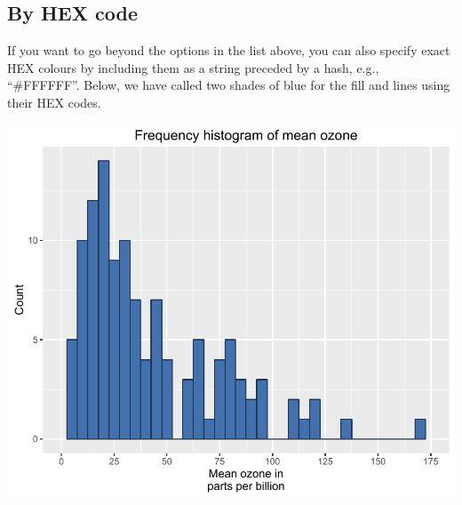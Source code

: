 \subsection{By HEX code}\label{by-hex-code}

If you want to go beyond the options in the list above, you can also
specify exact HEX colours by including them as a string preceded by a
hash, e.g., ``\#FFFFFF''. Below, we have called two shades of blue for
the fill and lines using their HEX codes.

\begin{Shaded}
\begin{Highlighting}[]

\StringTok{ }\NormalTok{(} \StringTok{ }
\StringTok{  }\NormalTok{(}\NormalTok{(}  \NormalTok{,}
      
\StringTok{  }\NormalTok{(} \NormalTok{,}
     \NormalTok{(}\NormalTok{, }\NormalTok{, }\NormalTok{), }\NormalTok{(}\NormalTok{, }\NormalTok{)) +}
\StringTok{  }\NormalTok{(} \NormalTok{) +}
\StringTok{  }\NormalTok{(}\NormalTok{)}
\end{Highlighting}
\end{Shaded}

\begin{center}\includegraphics[width=0.6\linewidth]{7_Histograms_pdf/histogram_10-1} \end{center}

